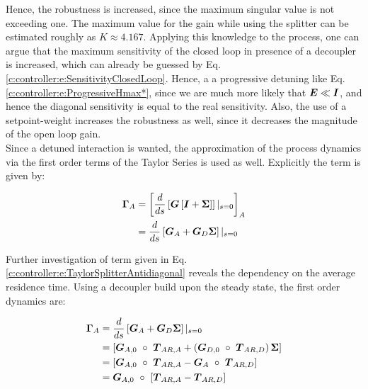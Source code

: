 Hence, the robustness is increased, since the maximum singular value is not exceeding one. The maximum value for the gain while using the splitter can be estimated roughly as $K \approx 4.167$. Applying this knowledge to the process, one can argue that the maximum sensitivity of the closed loop in presence of a decoupler is increased, which can already be guessed by Eq. \ref{c:controller:e:SensitivityClosedLoop}. Hence, a a progressive detuning like Eq.\ref{c:controller:e:ProgressiveHmax*}, since we are much more likely that $\mbox{\boldmath$E$} \ll \mbox{\boldmath$I$}$, and hence the diagonal sensitivity is equal to the real sensitivity. Also, the use of a setpoint-weight increases the robustness as well, since it decreases the magnitude of the open loop gain.\\ 

Since a detuned interaction is wanted, the approximation of the process dynamics via the first order terms of the Taylor Series is used as well. Explicitly the term is given by:

\begin{align}
\begin{split}
\mbox{\boldmath$\Gamma$}_A &= \left[\frac{d}{ds}\left[ \mbox{\boldmath$G$} \left[ \mbox{\boldmath$I$} + \mbox{\boldmath$\Sigma$} \right] \right]|_{s=0}\right]_A\\
&= \frac{d}{ds}\left[ \mbox{\boldmath$G$}_A + \mbox{\boldmath$G$}_D \mbox{\boldmath$\Sigma$} \right]|_{s=0}
\end{split}
\label{c:controller:e:TaylorSplitterAntidiagonal}
\end{align}

Further investigation of term given in Eq. \ref{c:controller:e:TaylorSplitterAntidiagonal} reveals the dependency on the average residence time. Using a decoupler build upon the steady state, the first order dynamics are:

\begin{align}
\begin{split}
\mbox{\boldmath$\Gamma$}_A &= \frac{d}{ds}\left[ \mbox{\boldmath$G$}_A + \mbox{\boldmath$G$}_D \mbox{\boldmath$\Sigma$} \right]|_{s=0} \\
&= \left[ \mbox{\boldmath$G$}_{A,0}~\circ~\mbox{\boldmath$T$}_{AR,A} + \left(\mbox{\boldmath$G$}_{D,0}~\circ~\mbox{\boldmath$T$}_{AR,D} \right) \mbox{\boldmath$\Sigma$} \right] \\
&= \left[ \mbox{\boldmath$G$}_{A,0}~\circ~\mbox{\boldmath$T$}_{AR,A} - \mbox{\boldmath$G$}_A~\circ~\mbox{\boldmath$T$}_{AR,D}  \right] \\
&= \mbox{\boldmath$G$}_{A,0}~\circ~\left[ \mbox{\boldmath$T$}_{AR,A} - \mbox{\boldmath$T$}_{AR,D}\right]
\end{split}
\label{c:controller:e:TaylorSplitterDynamics}
\end{align}

